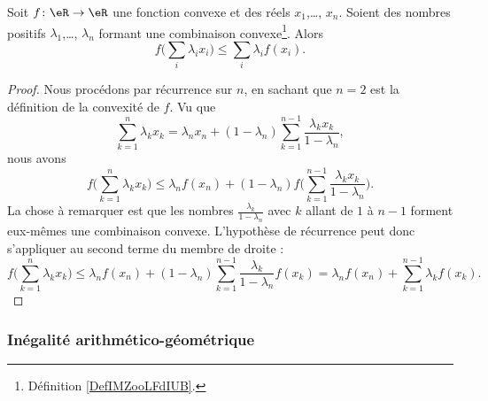 \begin{proposition}    \label{PropXIBooLxTkhU}
    Soit \( f\colon \eR\to \eR\) une fonction convexe et des réels \( x_1\),\ldots,  \( x_n\). Soient des nombres positifs \( \lambda_1\),\ldots,  \( \lambda_n\) formant une combinaison convexe\footnote{Définition \ref{DefIMZooLFdIUB}.}. Alors
    \begin{equation}
        f\big( \sum_i\lambda_ix_i \big)\leq \sum_i\lambda_if(x_i).
    \end{equation}
\end{proposition}

\begin{proof}
    Nous procédons par récurrence sur \( n\), en sachant que \( n=2\) est la définition de la convexité de \( f\). Vu que
    \begin{equation}
        \sum_{k=1}^n\lambda_kx_k=\lambda_nx_n+(1-\lambda_n)\sum_{k=1}^{n-1}\frac{ \lambda_kx_k }{ 1-\lambda_n },
    \end{equation}
    nous avons
    \begin{equation}
        f\big( \sum_{k=1}^n\lambda_kx_k \big)\leq \lambda_nf(x_n)+(1-\lambda_n)f\big( \sum_{k=1}^{n-1}\frac{ \lambda_kx_k }{ 1-\lambda_n } \big).
    \end{equation}
    La chose à remarquer est que les nombres \( \frac{ \lambda_k }{ 1-\lambda_n }\) avec \( k\) allant de \( 1\) à \( n-1\) forment eux-mêmes une combinaison convexe. L'hypothèse de récurrence peut donc s'appliquer au second terme du membre de droite :
    \begin{equation}
        f\big( \sum_{k=1}^n\lambda_kx_k \big)\leq \lambda_nf(x_n)+(1-\lambda_n)\sum_{k=1}^{n-1}\frac{ \lambda_k }{ 1-\lambda_n }f(x_k)=\lambda_nf(x_n)+\sum_{k=1}^{n-1}\lambda_kf(x_k).
    \end{equation}
\end{proof}

\subsubsection{Inégalité arithmético-géométrique}

